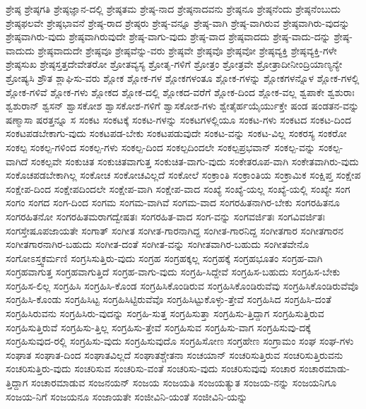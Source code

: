 {ಶ್ರೇಷ್ಠ
ಶ್ರೇಷ್ಠಗತಿ
ಶ್ರೇಷ್ಠಜ್ಞಾನ-ದಲ್ಲಿ
ಶ್ರೇಷ್ಠತಮ
ಶ್ರೇಷ್ಠ-ನಾದ
ಶ್ರೇಷ್ಠನಾದವನು
ಶ್ರೇಷ್ಠನೂ
ಶ್ರೇಷ್ಠನೆಂದು
ಶ್ರೇಷ್ಠನೆಂಬುದು
ಶ್ರೇಷ್ಠಫಲವೇ
ಶ್ರೇಷ್ಠಭಾವನೆ
ಶ್ರೇಷ್ಠ-ರಾದ
ಶ್ರೇಷ್ಠರು
ಶ್ರೇಷ್ಠ-ವನ್ನೂ
ಶ್ರೇಷ್ಠ-ವಾಗಿ
ಶ್ರೇಷ್ಠ-ವಾಗಿರುವ
ಶ್ರೇಷ್ಠವಾಗಿರು-ವುದನ್ನು
ಶ್ರೇಷ್ಠವಾಗಿರು-ವುದು
ಶ್ರೇಷ್ಠವಾಗಿರುವುದೇ
ಶ್ರೇಷ್ಠ-ವಾಗು-ವುದು
ಶ್ರೇಷ್ಠ-ವಾದ
ಶ್ರೇಷ್ಠವಾದದು
ಶ್ರೇಷ್ಠ-ವಾದು-ದನ್ನು
ಶ್ರೇಷ್ಠ-ವಾದುದು
ಶ್ರೇಷ್ಠವಾದುದೇ
ಶ್ರೇಷ್ಠವೂ
ಶ್ರೇಷ್ಠವೆನ್ನು-ವರು
ಶ್ರೇಷ್ಠವೇ
ಶ್ರೇಷ್ಠವೊ
ಶ್ರೇಷ್ಠವೋ
ಶ್ರೇಷ್ಠವ್ಯಕ್ತಿ
ಶ್ರೇಷ್ಠವ್ಯಕ್ತಿ-ಗಳೇ
ಶ್ರೇಷ್ಠಸುಖ
ಶ್ರೇಷ್ಠಸ್ತತ್ತದೇವೇತರೋ
ಶ್ರೋತವ್ಯಸ್ಯ
ಶ್ರೋತೃ-ಗಳಿಗೆ
ಶ್ರೋತ್ರಂ
ಶ್ರೋತ್ರವೇ
ಶ್ರೋತ್ರಾದೀನೀಂದ್ರಿಯಾಣ್ಯನ್ಯೇ
ಶ್ರೋಷ್ಯಸಿ
ಶ್ರೌತ
ಶ್ಲಾಘಿಸು-ವರು
ಶ್ಲೋಕ
ಶ್ಲೋಕ-ಗಳ
ಶ್ಲೋಕಗಳಂತೂ
ಶ್ಲೋಕ-ಗಳನ್ನು
ಶ್ಲೋಕಗಳನ್ನೊಳ
ಶ್ಲೋಕ-ಗಳಲ್ಲಿ
ಶ್ಲೋಕ-ಗಳಿವೆ
ಶ್ಲೋಕ-ಗಳು
ಶ್ಲೋಕದ
ಶ್ಲೋಕ-ದಲ್ಲಿ
ಶ್ಲೋಕದ-ವರೆಗೆ
ಶ್ಲೋಕ-ದಿಂದ
ಶ್ಲೋಕ-ವಲ್ಲ
ಶ್ವಪಾಕೇ
ಶ್ವಶುರಾಃ
ಶ್ವಶುರಾನ್
ಶ್ವಸನ್
ಶ್ವಾಸಕೋಶ
ಶ್ವಾಸಕೋಶ-ಗಳಿಗೆ
ಶ್ವಾಸಕೋಶ-ಗಳು
ಶ್ವೇತೈರ್ಹಯೈರ್ಯುಕ್ತೇ
ಷಂಡ
ಷಂಡತನ-ವನ್ನು
ಷಣ್ಮಾಸಾ
ಷರತ್ತನ್ನೂ
ಸ
ಸಂಕಟ
ಸಂಕಟಕ್ಕೆ
ಸಂಕಟ-ಗಳನ್ನು
ಸಂಕಟಗಳಲ್ಲಿಯೂ
ಸಂಕಟ-ಗಳು
ಸಂಕಟದ
ಸಂಕಟ-ದಿಂದ
ಸಂಕಟಪಡಬೇಕಾಗು-ವುದು
ಸಂಕಟಪಡ-ಬೇಕು
ಸಂಕಟಪಡುವುದೇ
ಸಂಕಟ-ವನ್ನು
ಸಂಕಟ-ವಿಲ್ಲ
ಸಂಕರಸ್ಯ
ಸಂಕರೋ
ಸಂಕಲ್ಪ
ಸಂಕಲ್ಪ-ಗಳಿಂದ
ಸಂಕಲ್ಪ-ಗಳು
ಸಂಕಲ್ಪ-ದಿಂದ
ಸಂಕಲ್ಪದಿಂದಲೇ
ಸಂಕಲ್ಪಪ್ರಭವಾನ್
ಸಂಕಲ್ಪ-ವನ್ನು
ಸಂಕಲ್ಪ-ವಾಗಿದೆ
ಸಂಕಲ್ಪವೇ
ಸಂಕುಚಿತ
ಸಂಕುಚಿತವಾಗುತ್ತ
ಸಂಕುಚಿತ-ವಾಗು-ವುದು
ಸಂಕೇತರೂಪ-ವಾಗಿ
ಸಂಕೇತವಾಗಿರು-ವುದು
ಸಂಕೊಚಪಡಬೇಕಾಗಿಲ್ಲ
ಸಂಕೋಚ
ಸಂಕೋಚವಿಲ್ಲದೆ
ಸಂಕೋಲೆ
ಸಂಕ್ರಾಂತಿ
ಸಂಕ್ರಾಂತಿಯ
ಸಂಕ್ರಾಮಿಕ
ಸಂಕ್ಷಿಪ್ತ
ಸಂಕ್ಷೇಪ
ಸಂಕ್ಷೇಪ-ದಿಂದ
ಸಂಕ್ಷೇಪದಿಂದಲೇ
ಸಂಕ್ಷೇಪ-ವಾಗಿ
ಸಂಕ್ಷೇಪ-ವಾದ
ಸಂಖ್ಯೆ
ಸಂಖ್ಯೆ-ಯಲ್ಲ
ಸಂಖ್ಯೆ-ಯಲ್ಲಿ
ಸಂಖ್ಯೇ
ಸಂಗ
ಸಂಗಂ
ಸಂಗದ
ಸಂಗ-ದಿಂದ
ಸಂಗಮ
ಸಂಗಮ-ವಾಗಿವೆ
ಸಂಗಮ-ವಾದ
ಸಂಗರಹಿತನಾಗಿರ-ಬೇಕು
ಸಂಗರಹಿತನೂ
ಸಂಗರಹಿತನೋ
ಸಂಗರಹಿತಮರಾಗದ್ವೇಷತಃ
ಸಂಗರಹಿತ-ವಾದ
ಸಂಗ-ವನ್ನು
ಸಂಗವರ್ಜಿತಃ
ಸಂಗವಿವರ್ಜಿತಃ
ಸಂಗಸ್ತೇಷೂಪಜಾಯತೇ
ಸಂಗಾತ್
ಸಂಗೀತ
ಸಂಗೀತ-ಗಾರನಾಗಿದ್ದ
ಸಂಗೀತ-ಗಾರನಿದ್ದ
ಸಂಗೀತಗಾರ
ಸಂಗೀತಗಾರನ
ಸಂಗೀತಗಾರನಾಗಿರ-ಬಹುದು
ಸಂಗೀತ-ದಂತೆ
ಸಂಗೀತ-ವನ್ನು
ಸಂಗೀತವಾಗಿರ-ಬಹುದು
ಸಂಗೀತವೇನೊ
ಸಂಗೋಽಸ್ತ್ವಕರ್ಮಣಿ
ಸಂಗ್ರಸಿಸುತ್ತಿರು-ವುದು
ಸಂಗ್ರಹ
ಸಂಗ್ರಹಕ್ಕಲ್ಲ
ಸಂಗ್ರಹಕ್ಕೆ
ಸಂಗ್ರಹಭೂತಂ
ಸಂಗ್ರಹ-ವಾಗಿ
ಸಂಗ್ರಹವಾಗುತ್ತ
ಸಂಗ್ರಹವಾಗುತ್ತಿದೆ
ಸಂಗ್ರಹ-ವಾಗು-ವುದು
ಸಂಗ್ರಹಿ-ಸಿದ್ದೇವೆ
ಸಂಗ್ರಹಿಸ-ಬಹುದು
ಸಂಗ್ರಹಿಸ-ಬೇಕು
ಸಂಗ್ರಹಿಸ-ಲಿಲ್ಲ
ಸಂಗ್ರಹಿಸಿ
ಸಂಗ್ರಹಿಸಿ-ಕೊಂಡ
ಸಂಗ್ರಹಿಸಿಕೊಂಡಿರುವ
ಸಂಗ್ರಹಿಸಿಕೊಂಡಿರುವೆವು
ಸಂಗ್ರಹಿಸಿಕೊಂಡಿರುವೆವೊ
ಸಂಗ್ರಹಿಸಿ-ಕೊಂಡು
ಸಂಗ್ರಹಿಸಿಟ್ಟ
ಸಂಗ್ರಹಿಸಿಟ್ಟಿರುವೆವೊ
ಸಂಗ್ರಹಿಸಿಟ್ಟುಕೊಳ್ಳು-ತ್ತೇವೆ
ಸಂಗ್ರಹಿಸಿದ
ಸಂಗ್ರಹಿಸಿ-ದಂತೆ
ಸಂಗ್ರಹಿಸಿರುವನು
ಸಂಗ್ರಹಿಸಿರು-ವುದನ್ನು
ಸಂಗ್ರಹಿ-ಸುತ್ತ
ಸಂಗ್ರಹಿಸುತ್ತಾ
ಸಂಗ್ರಹಿಸು-ತ್ತಿದ್ದಾಗ
ಸಂಗ್ರಹಿಸುತ್ತಿರುವ
ಸಂಗ್ರಹಿಸುತ್ತಿರುವೆ
ಸಂಗ್ರಹಿಸು-ತ್ತಿಲ್ಲ
ಸಂಗ್ರಹಿಸು-ತ್ತೇವೆ
ಸಂಗ್ರಹಿಸುವ
ಸಂಗ್ರಹಿಸು-ವಾಗ
ಸಂಗ್ರಹಿಸುವು-ದಕ್ಕೆ
ಸಂಗ್ರಹಿಸುವುದ-ರಲ್ಲಿ
ಸಂಗ್ರಹಿಸು-ವುದು
ಸಂಗ್ರಹಿಸುವುದೊ
ಸಂಗ್ರಹಿಸೋಣ
ಸಂಗ್ರಹೇಣ
ಸಂಗ್ರಾಮಂ
ಸಂಘ
ಸಂಘ-ಗಳು
ಸಂಘಾತ
ಸಂಘಾತ-ದಿಂದ
ಸಂಘಾತವಿಲ್ಲದೆ
ಸಂಘಾತಶ್ಚೇತನಾ
ಸಂಚಯಾನ್
ಸಂಚರಿಸುತ್ತಿರುವ
ಸಂಚರಿಸುತ್ತಿರುವನು
ಸಂಚರಿಸುತ್ತಿರು-ವುದು
ಸಂಚರಿಸುವ
ಸಂಚರಿಸು-ವಂತೆ
ಸಂಚರಿಸು-ವುದು
ಸಂಚರಿಸುವುವು
ಸಂಚಾರ
ಸಂಚಾರಮಾಡು-ತ್ತಿದ್ದಾಗ
ಸಂಚಾರಮಾಡುವ
ಸಂಜನಯನ್
ಸಂಜಯ
ಸಂಜಯತಿ
ಸಂಜಯತ್ಯುತ
ಸಂಜಯ-ನನ್ನು
ಸಂಜಯನಿಗೂ
ಸಂಜಯ-ನಿಗೆ
ಸಂಜಯನೂ
ಸಂಜಾಯತೇ
ಸಂಜೀವಿನಿ-ಯಂತೆ
ಸಂಜೀವಿನಿ-ಯನ್ನು
}
